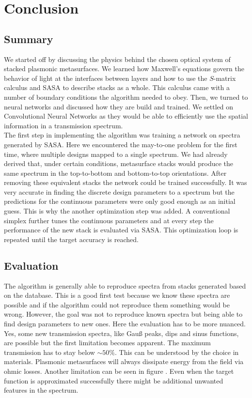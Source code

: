 \section{Conclusion} \label{sec:conclusion}

\subsection{Summary}
We started off by discussing the physics behind the chosen optical system of stacked plasmonic metasurfaces. 
We learned how Maxwell's equations govern the behavior of light at the interfaces between layers and how to use the $S$-matrix calculus and SASA to describe stacks as a whole. This calculus came with a number of boundary conditions the algorithm needed to obey. Then, we turned to neural networks and discussed how they are build and trained. We settled on Convolutional Neural Networks as they would be able to efficiently use the spatial information in a transmission spectrum.
\\

\indent
The first step in implementing the algorithm was training a network on spectra generated by SASA. Here we encountered the may-to-one problem for the first time, where multiple designs mapped to a single spectrum. We had already derived that, under certain conditions, metasurface stacks would produce the same spectrum in the top-to-bottom and bottom-to-top orientations. After removing these equivalent stacks the network could be trained successfully. It was very accurate in finding the discrete design parameters to a spectrum but the predictions for the continuous parameters were only good enough as an initial guess.
This is why the another optimization step was added. A conventional simplex further tunes the continuous parameters and at every step the performance of the new stack is evaluated via SASA. This optimization loop is repeated until the target accuracy is reached.


\subsection{Evaluation} \label{sec:eval}
The algorithm is generally able to reproduce spectra from stacks generated based on the database. 
This is a good first test because we know these spectra are possible and if the algorithm could not reproduce them something would be wrong. However, the goal was not to reproduce known spectra but being able to find design parameters to new ones. Here the evaluation has to be more nuanced. Yes, some new transmission spectra, like Gauß peaks, dips and sinus functions, are possible but the first limitation becomes apparent.
The maximum transmission has to stay below $\sim 50\%$. This can be understood by the choice in materials. Plasmonic metasurfaces will always dissipate energy from the field via ohmic losses. Another limitation can be seen in figure . Even when the target function is approximated successfully there might be additional unwanted features in the spectrum. 
\\

